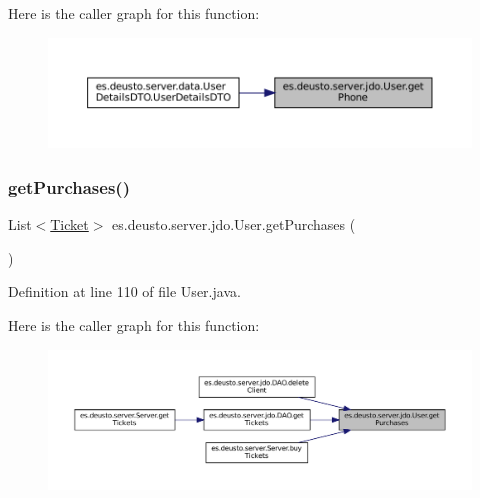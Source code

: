 Here is the caller graph for this function\+:
\nopagebreak
\begin{figure}[H]
\begin{center}
\leavevmode
\includegraphics[width=350pt]{classes_1_1deusto_1_1server_1_1jdo_1_1_user_a9ad4609fbf59521908115b9c49d903f4_icgraph}
\end{center}
\end{figure}
\mbox{\label{classes_1_1deusto_1_1server_1_1jdo_1_1_user_a320e5da31fb294ff638ff77b0c4f6de4}} 
\subsubsection{\texorpdfstring{getPurchases()}{getPurchases()}}
{\footnotesize\ttfamily List$<$\mbox{\hyperlink{classes_1_1deusto_1_1server_1_1jdo_1_1_ticket}{Ticket}}$>$ es.\+deusto.\+server.\+jdo.\+User.\+get\+Purchases (\begin{DoxyParamCaption}{ }\end{DoxyParamCaption})}



Definition at line 110 of file User.\+java.

Here is the caller graph for this function\+:
\nopagebreak
\begin{figure}[H]
\begin{center}
\leavevmode
\includegraphics[width=350pt]{classes_1_1deusto_1_1server_1_1jdo_1_1_user_a320e5da31fb294ff638ff77b0c4f6de4_icgraph}
\end{center}
\end{figure}
\mbox{\label{classes_1_1deusto_1_1server_1_1jdo_1_1_user_adc7114247c7881e3f9e0fd14b7905f9a}} 
